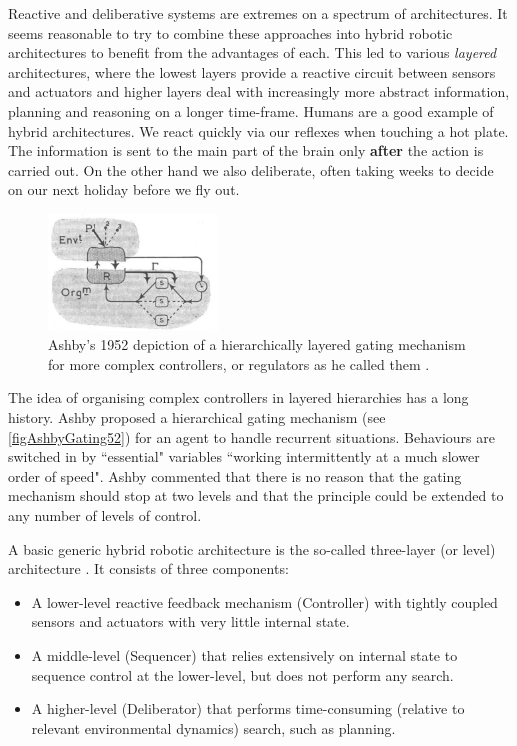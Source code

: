 \documentclass[pdftex,11pt,a4paper]{report}
\begin{document}
Reactive and deliberative systems are extremes on a spectrum of architectures. It seems reasonable to try to combine these approaches into hybrid robotic architectures to benefit from the advantages of each. This led to various \emph{layered} architectures, where the lowest layers provide a reactive circuit between sensors and actuators and higher layers deal with increasingly more abstract information, planning and reasoning on a longer time-frame.  Humans are a good example of hybrid architectures. We react quickly via our reflexes when touching a hot plate. The information is sent to the main part of the brain only \textbf{after} the action is carried out. On the other hand we also deliberate, often taking weeks to decide on our next holiday before we fly out. 

\begin{figure}[ht]
\centering
\includegraphics[width=0.4\textwidth]{figures/AshbyGating52}
\caption{Ashby's 1952 depiction of a hierarchically layered gating mechanism for more complex controllers, or regulators as he called them \cite{ashby52design}.} \label{figAshbyGating52}
\end{figure}

The idea of organising complex controllers in layered hierarchies has a long history. 
Ashby \cite{ashby52design} proposed a hierarchical gating mechanism (see
\autoref{figAshbyGating52}) for an agent to handle recurrent
situations. Behaviours are switched in by
``essential" variables ``working intermittently at a much slower
order of speed". Ashby commented that there is no reason
that the gating mechanism should stop at two levels and that the
principle could be extended to any number of levels of control.

A basic generic hybrid robotic architecture is the so-called three-layer (or level) architecture \cite{Gat97onthree-layer}. It consists of three components:
\begin{itemize}
\item A lower-level reactive feedback mechanism (Controller) with tightly coupled sensors and actuators with very little internal state.
\item A middle-level (Sequencer) that relies extensively on internal state  to sequence control at the lower-level, but does not perform any search.
\item A higher-level (Deliberator) that performs time-consuming (relative to relevant environmental dynamics) search, such as planning. 
\end{itemize}
\end{document}
